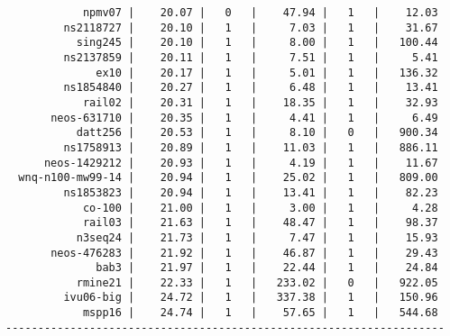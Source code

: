 \begin{lstlisting}
            npmv07 |    20.07 |   0   |    47.94 |   1   |    12.03
         ns2118727 |    20.10 |   1   |     7.03 |   1   |    31.67
           sing245 |    20.10 |   1   |     8.00 |   1   |   100.44
         ns2137859 |    20.11 |   1   |     7.51 |   1   |     5.41
              ex10 |    20.17 |   1   |     5.01 |   1   |   136.32
         ns1854840 |    20.27 |   1   |     6.48 |   1   |    13.41
            rail02 |    20.31 |   1   |    18.35 |   1   |    32.93
       neos-631710 |    20.35 |   1   |     4.41 |   1   |     6.49
           datt256 |    20.53 |   1   |     8.10 |   0   |   900.34
         ns1758913 |    20.89 |   1   |    11.03 |   1   |   886.11
      neos-1429212 |    20.93 |   1   |     4.19 |   1   |    11.67
  wnq-n100-mw99-14 |    20.94 |   1   |    25.02 |   1   |   809.00
         ns1853823 |    20.94 |   1   |    13.41 |   1   |    82.23
            co-100 |    21.00 |   1   |     3.00 |   1   |     4.28
            rail03 |    21.63 |   1   |    48.47 |   1   |    98.37
           n3seq24 |    21.73 |   1   |     7.47 |   1   |    15.93
       neos-476283 |    21.92 |   1   |    46.87 |   1   |    29.43
              bab3 |    21.97 |   1   |    22.44 |   1   |    24.84
           rmine21 |    22.33 |   1   |   233.02 |   0   |   922.05
         ivu06-big |    24.72 |   1   |   337.38 |   1   |   150.96
            mspp16 |    24.74 |   1   |    57.65 |   1   |   544.68
--------------------------------------------------------------------
\end{lstlisting}
    